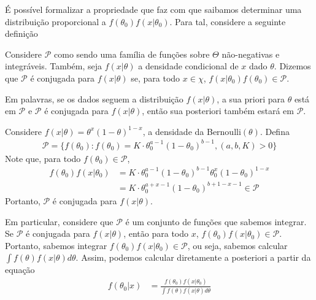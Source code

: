 É possível formalizar a propriedade que faz com que
saibamos determinar uma distribuição proporcional a
$f(\theta_{0})f(x|\theta_{0})$.
Para tal, considere a seguinte definição
\begin{definition}
 Considere $\mathcal{P}$ como sendo uma família de 
 funções sobre $\Theta$ não-negativas e integráveis.
 Também, seja $f(x|\theta)$ a densidade condicional de
 $x$ dado $\theta$. Dizemos que 
 $\mathcal{P}$ é conjugada para $f(x|\theta)$ se,
 para todo $x \in \chi$,
 $f(x|\theta_{0})f(\theta_{0}) \in \mathcal{P}$.
\end{definition}
Em palavras, se os dados seguem a
distribuição $f(x|\theta)$,
a sua priori para $\theta$ está em $\mathcal{P}$ e
$\mathcal{P}$ é conjugada para $f(x|\theta)$,
então sua posteriori também estará em $\mathcal{P}$.

\begin{example}
 \label{example:bernoulli_conjugate_1}
 Considere $f(x|\theta) = \theta^{x}(1-\theta)^{1-x}$,
 a densidade da Bernoulli$(\theta)$.
 Defina 
 \begin{align*}
  \mathcal{P} = \{f(\theta_{0}): f(\theta_{0}) 
  =K \cdot \theta_{0}^{a-1}(1-\theta_{0})^{b-1},
  (a,b,K) > 0\}
 \end{align*}
 Note que, para todo $f(\theta_{0}) \in \mathcal{P}$,
 \begin{align*}
  f(\theta_{0})f(x|\theta_{0})
  &= K \cdot \theta_{0}^{a-1}(1-\theta_{0})^{b-1}
  \theta_{0}^{x}(1-\theta_{0})^{1-x} \\
  &= K \cdot \theta_{0}^{a+x-1}(1-\theta_{0})^{b+1-x-1}
  \in \mathcal{P}
 \end{align*}
 Portanto, $\mathcal{P}$ é conjugada para
 $f(x|\theta)$.
\end{example}

Em particular, considere que $\mathcal{P}$ é
um conjunto de funções que sabemos integrar.
Se $\mathcal{P}$ é conjugada para $f(x|\theta)$, então para todo $x$,
$f(\theta_{0})f(x|\theta_{0}) \in \mathcal{P}$.
Portanto, sabemos integrar 
$f(\theta_{0})f(x|\theta_{0}) \in \mathcal{P}$, ou seja,
sabemos calcular $\int{f(\theta)f(x|\theta)d\theta}$. Assim, podemos calcular diretamente a posteriori a
partir da equação
\begin{align*}
 f(\theta_{0}|x)
 &= \frac{f(\theta_{0})f(x|\theta_{0})}
 {\int{f(\theta)f(x|\theta)d\theta}}
\end{align*}

